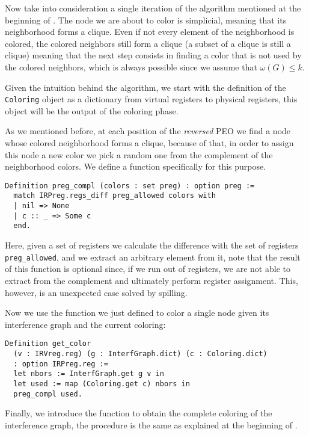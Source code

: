 Now take into consideration a single iteration of the algorithm mentioned at the beginning of . The node we are about to color is simplicial, meaning that its neighborhood forms a clique. Even if not every element of the neighborhood is colored, the colored neighbors still form a clique (a subset of a clique is still a clique) meaning that the next step consists in finding a color that is not used by the colored neighbors, which is always possible since we assume that $\omega(G) \leq k$.

Given the intuition behind the algorithm, we start with the definition of the \texttt{Coloring} object as a dictionary from virtual registers to physical registers, this object will be the output of the coloring phase.

As we mentioned before, at each position of the \textit{reversed} PEO we find a node whose colored neighborhood forms a clique, because of that, in order to assign this node a new color we pick a random one from the complement of the neighborhood colors. We define a function specifically for this purpose.

\begin{lstlisting}[style=Coq]
Definition preg_compl (colors : set preg) : option preg :=
  match IRPreg.regs_diff preg_allowed colors with
  | nil => None
  | c :: _ => Some c
  end.
\end{lstlisting}

Here, given a set of registers we calculate the difference with the set of registers \texttt{preg\_allowed}, and we extract an arbitrary element from it, note that the result of this function is optional since, if we run out of registers, we are not able to extract from the complement and ultimately perform register assignment. This, however, is an unexpected case solved by spilling.

Now we use the function we just defined to color a single node given its interference graph and the current coloring:

\begin{lstlisting}[style=Coq]
Definition get_color
  (v : IRVreg.reg) (g : InterfGraph.dict) (c : Coloring.dict)
  : option IRPreg.reg :=
  let nbors := InterfGraph.get g v in
  let used := map (Coloring.get c) nbors in
  preg_compl used.
\end{lstlisting}

Finally, we introduce the function to obtain the complete coloring of the interference graph, the procedure is the same as explained at the beginning of .

